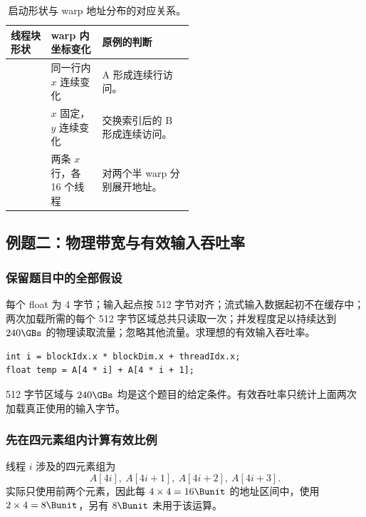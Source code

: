 \begin{table}[H]
  \centering\small
  \caption{启动形状与 warp 地址分布的对应关系。}
  \begin{tabularx}{\linewidth}{@{}L{0.22\linewidth}L{0.29\linewidth}Y@{}}
  \toprule
  线程块形状 & warp 内坐标变化 & 原例的判断\\
  \midrule
   & 同一行内 $x$ 连续变化 & A 形成连续行访问。\\
   & $x$ 固定，$y$ 连续变化 & 交换索引后的 B 形成连续访问。\\
   & 两条 $x$ 行，各 16 个线程 & 对两个半 warp 分别展开地址。\\
  \bottomrule
  \end{tabularx}
\end{table}
\FloatBarrier

\subsection{例题二：物理带宽与有效输入吞吐率}
\subsubsection{保留题目中的全部假设}
\par\noindent\begin{minipage}{\linewidth}
每个 float 为 4 字节；输入起点按 512 字节对齐；流式输入数据起初不在缓存中；两次加载所需的每个 512 字节区域总共只读取一次；并发程度足以持续达到 $240\GBs$ 的物理读取流量；忽略其他流量。求理想的有效输入吞吐率。

\begin{lstlisting}[caption={每个线程使用四个连续元素中的前两个。}]
int i = blockIdx.x * blockDim.x + threadIdx.x;
float temp = A[4 * i] + A[4 * i + 1];
\end{lstlisting}
\end{minipage}\par

512 字节区域与 $240\GBs$ 均是这个题目的给定条件。有效吞吐率只统计上面两次加载真正使用的输入字节。

\subsubsection{先在四元素组内计算有效比例}
线程 $i$ 涉及的四元素组为
\begin{equation}
  A[4i],\ A[4i+1],\ A[4i+2],\ A[4i+3].
\end{equation}
实际只使用前两个元素，因此每 $4\times4=16\Bunit$ 的地址区间中，使用 $2\times4=8\Bunit$，另有 $8\Bunit$ 未用于该运算。

